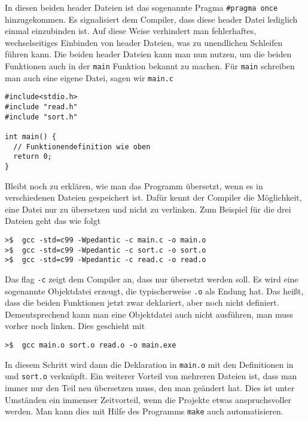 In diesen beiden header Dateien ist das sogenannte Pragma \texttt{#pragma once} hinzugekommen.
Es signalisiert dem Compiler, dass diese header Datei lediglich einmal einzubinden ist.
Auf diese Weise verhindert man fehlerhaftes, wechselseitiges Einbinden von header Dateien, was zu unendlichen Schleifen führen kann.
Die beiden header Dateien kann man nun nutzen, um die beiden Funktionen auch in der \texttt{main} Funktion bekannt zu machen.
Für \texttt{main} schreiben man auch eine eigene Datei, sagen wir \texttt{main.c}
\begin{lstlisting}[caption={Datei \texttt{main.c}}, belowcaptionskip=0.3em]
#include<stdio.h>
#include "read.h"
#include "sort.h"

int main() {
  // Funktionendefinition wie oben
  return 0;
}
\end{lstlisting}
Bleibt noch zu erklären, wie man das Programm übersetzt, wenn es in verschiedenen Dateien gespeichert ist.
Dafür kennt der Compiler die Möglichkeit, eine Datei nur zu übersetzen und nicht zu verlinken.
Zum Beispiel für die drei Dateien geht das wie folgt

\vspace*{0.5cm}
\begin{verbatim}
>$  gcc -std=c99 -Wpedantic -c main.c -o main.o
>$  gcc -std=c99 -Wpedantic -c sort.c -o sort.o
>$  gcc -std=c99 -Wpedantic -c read.c -o read.o
\end{verbatim}
\vspace*{0.5cm}

Das flag \texttt{-c} zeigt dem Compiler an, dass nur übersetzt werden soll.
Es wird eine sogenannte Objektdatei erzeugt, die typischerweise \texttt{.o} als Endung hat.
Das heißt, dass die beiden Funktionen jetzt zwar deklariert, aber noch nicht definiert.
Dementsprechend kann man eine Objektdatei auch nicht ausführen, man muss vorher noch linken.
Dies geschieht mit

\vspace*{0.5cm}
\begin{verbatim}
>$  gcc main.o sort.o read.o -o main.exe
\end{verbatim}
\vspace*{0.5cm}

In diesem Schritt wird dann die Deklaration in \texttt{main.o} mit den Definitionen in  und \texttt{sort.o} verknüpft.
Ein weiterer Vorteil von mehreren Dateien ist, dass man immer nur den Teil neu übersetzen muss, den man geändert hat.
Dies ist unter Umständen ein immenser Zeitvorteil, wenn die Projekte etwas anspruchsvoller werden.
Man kann dies mit Hilfe des Programms \texttt{make} auch automatisieren.

\endinput
